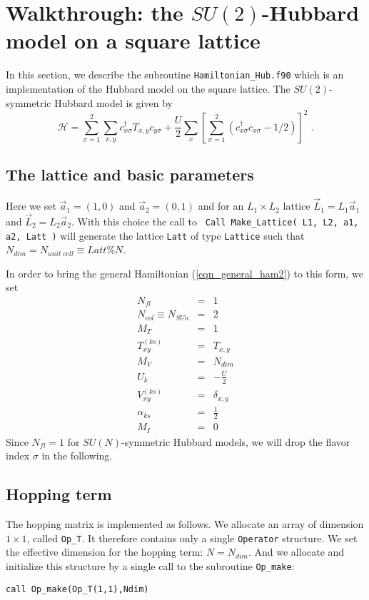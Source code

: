 \section{Walkthrough: the $SU(2)$-Hubbard model on a square lattice}
In this section, we describe the subroutine \texttt{Hamiltonian\_Hub.f90} which is an implementation of the Hubbard model on the square lattice. 
The $SU(2)$-symmetric Hubbard model is given by
\begin{equation}
\label{eqn_hubbard_sun}
\mathcal{H}=
\sum\limits_{\sigma=1}^{2} 
\sum\limits_{x,y } 
  c^{\dagger}_{x \sigma} T_{x,y}c^{\phantom\dagger}_{y \sigma} 
+ \frac{U}{2}\sum\limits_{x}\left[
\sum\limits_{\sigma=1}^{2}
\left(  c^{\dagger}_{x \sigma} c^{\phantom\dagger}_{x \sigma}  -1/2 \right) \right]^{2}\;.
\end{equation}

\subsection{The lattice  and basic parameters}
Here we set $\vec{a}_1 =  (1,0) $ and $\vec{a}_2 =  (0,1) $  and for an $L_1 \times L_2$  lattice  $\vec{L}_1 = L_1 \vec{a}_1$ and  $\vec{L}_2 = L_2 \vec{a}_2$.     
With this choice   the call to  \texttt{ Call Make\_Lattice( L1, L2, a1,  a2, Latt )} will generate the lattice   \texttt{Latt} of type \texttt{Lattice} such that  $N_{dim}   =N_{unit\;cell} \equiv Latt\%N$. 

In order to bring the general Hamiltonian (\ref{eqn_general_ham2}) to this form, we set
\begin{eqnarray}
N_{fl}         &=&  1 \nonumber\\
N_{col} \equiv N_{SUn}       &=&  2 \nonumber\\
M_T      & = &   1 \nonumber \\
T^{(ks)}_{x y}        &=&    T_{x,y}  \nonumber\\
M_V              &=&  N_{dim} \nonumber\\
U_{k}          &=&   -\frac{U}{2} \nonumber\\
V_{x y}^{(ks)} &=&  \delta_{x,y} \nonumber\\
\alpha_{ks}     &=&  \frac{1}{2} \nonumber \\
M_I              &=&  0
\end{eqnarray}
Since $N_{fl}=1$ for $SU(N)$-symmetric Hubbard models, we will drop the flavor index $\sigma$ in the following.  

\subsection{Hopping term}
The hopping matrix is implemented as follows. 
We allocate an array of dimension $1\times 1$, called \texttt{Op\_T}. It therefore contains only a single \texttt{Operator} structure.
We set the effective dimension for the hopping term: $N=N_{dim}$. 
And we allocate and initialize this structure by a single call to the subroutine \texttt{Op\_make}: 
\begin{verbatim}
call Op_make(Op_T(1,1),Ndim)
\end{verbatim}

